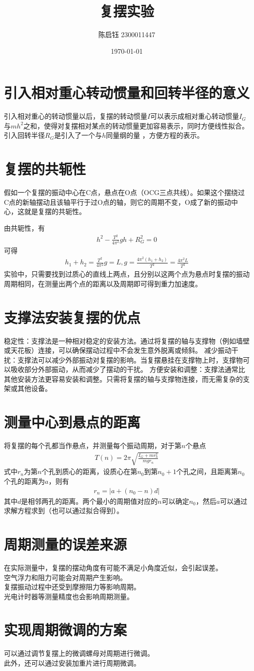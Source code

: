 \documentclass{ctexart}
\title{复摆实验}
\author{陈启钰\,\,2300011447}
\date{\today}
\begin{document}
	\maketitle
	\section{引入相对重心转动惯量和回转半径的意义}
	引入相对重心的转动惯量以后，复摆的转动惯量$I$可以表示成相对重心转动惯量$I_G$与$mh^2$之和，使得对复摆相对某点的转动惯量更加容易表示，同时方便线性拟合。引入回转半径$R_G$是引入了一个与$h$同量纲的量 ，方便方程的表示。
	\section{复摆的共轭性}
	假如一个复摆的振动中心在C点，悬点在O点（OCG三点共线）。如果这个摆绕过C点的新轴摆动且该轴平行于过O点的轴，则它的周期不变，O成了新的振动中心，这就是复摆的共轭性。
	
	由共轭性，有
	\begin{align}
		h^2-\frac{T^2}{4\pi^2}gh+R_G^2=0
	\end{align}
	可得
	\begin{align}
		h_1+h_2=\frac{T^2}{4\pi^2}g=L,g=\frac{4\pi^2(h_1+h_2)}{T^2}=\frac{4\pi^2L}{T^2}
	\end{align}
	实验中，只需要找到过质心的直线上两点，且分别以这两个点为悬点时复摆的振动周期相同，在测量出两个点的距离以及周期即可得到重力加速度。
	\section{支撑法安装复摆的优点}
	稳定性：支撑法是一种相对稳定的安装方法。通过将复摆的轴与支撑物（例如墙壁或天花板）连接，可以确保摆动过程中不会发生意外脱离或倾斜。
	减少振动干扰：支撑法可以减少外部振动对复摆的影响。当复摆悬挂在支撑物上时，支撑物可以吸收部分外部振动，从而减少了摆动的干扰。
	方便安装和调整：支撑法通常比其他安装方法更容易安装和调整。只需将复摆的轴与支撑物连接，而无需复杂的支架或其他设备。
	\section{测量中心到悬点的距离}
	将复摆的每个孔都当作悬点，并测量每个振动周期，对于第$n$个悬点
	\begin{align}
		T(n)=2\pi\sqrt{\frac{I_G+mr_n^2}{mgr_n}}
	\end{align}
	式中$r_n$为第$n$个孔到质心的距离，设质心在第$n_0$到第$n_0+1$个孔之间，且距离第$n_0$个孔的距离为$a$，则有
	\begin{align}
		r_n=|a+(n_0-n)d|
	\end{align}
	其中$d$是相邻两孔的距离。两个最小的周期值对应的$n$可以确定$n_0$，然后$a$可以通过求解方程求到（也可以通过拟合得到）。
	\section{周期测量的误差来源}
	在实际测量中，复摆的摆动角度有可能不满足小角度近似，会引起误差。\\
	空气浮力和阻力可能会对周期产生影响。\\
	复摆振动过程中还受到摩擦阻力等影响周期。\\
	光电计时器等测量精度也会影响周期测量。
	\section{实现周期微调的方案}
	可以通过调节复摆上的微调螺母对周期进行微调。\\
	此外，还可以通过安装加重片进行周期微调。
\end{document}
